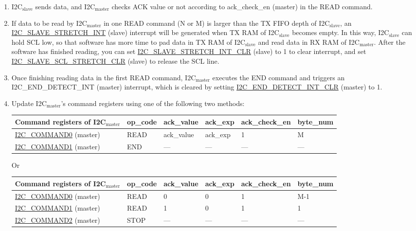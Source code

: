 \documentclass[main\_\_EN.tex]{subfiles}
\begin{document}
\begin{enumerate}
\item I2C$_\text{slave}$ sends data, and I2C$_\text{master}$ checks ACK value or not according to ack\_check\_en (master) in the READ command.
\item If data to be read by I2C$_\text{master}$ in one READ command (N or M) is larger than the TX FIFO depth of I2C$_\text{slave}$, an \hyperref[int:i2c-slave-stretch]{I2C\_SLAVE\_STRETCH\_INT} (slave) interrupt will be generated when TX RAM of I2C$_\text{slave}$ becomes empty. In this way, I2C$_\text{slave}$ can hold SCL low, so that software has more time to pad data in TX RAM of I2C$_\text{slave}$ and read data in RX RAM of I2C$_\text{master}$. After the software has finished reading, you can set \hyperref[fielddesc:I2CSLAVESTRETCHINTCLR]{I2C\_SLAVE\_STRETCH\_INT\_CLR} (slave) to 1 to clear interrupt, and set \hyperref[fielddesc:I2CSLAVESCLSTRETCHCLR]{I2C\_SLAVE\_SCL\_STRETCH\_CLR} (slave) to release the SCL line.
\item Once finishing reading data in the first READ command, I2C$_\text{master}$ executes the END command and triggers an I2C\_END\_DETECT\_INT (master) interrupt, which is cleared by setting \hyperref[fielddesc:I2CENDDETECTINTCLR]{I2C\_END\_DETECT\_INT\_CLR} (master) to 1.
\item Update I2C$_\text{master}$'s command registers using one of the following two methods:
\begin{longtable}{ | p{4cm} | p{2cm} | p{2cm} | p{2cm} |p{2cm} | p{2cm} |}
\hline\rowcolor{lightgray}
Command registers of I2C$_\text{master}$& op\_code & ack\_value&ack\_exp&ack\_check\_en&byte\_num  \\ \hline
\hyperref[fielddesc:I2CCOMMAND0]{I2C\_COMMAND0} (master)& READ& ack\_value&ack\_exp&1&M  \\ \hline
\hyperref[fielddesc:I2CCOMMAND1]{I2C\_COMMAND1} (master)& END& ---&---&---&---  \\ \hline
\end{longtable} 

Or

\begin{longtable}{ | p{4cm} | p{2cm} | p{2cm} | p{2cm} |p{2cm} | p{2cm} |}
\hline\rowcolor{lightgray}
Command registers of I2C$_\text{master}$& op\_code & ack\_value&ack\_exp&ack\_check\_en&byte\_num  \\ \hline
\hyperref[fielddesc:I2CCOMMAND0]{I2C\_COMMAND0} (master)& READ& 0&0&1&M-1  \\ \hline
\hyperref[fielddesc:I2CCOMMAND1]{I2C\_COMMAND1} (master)& READ& 1&0&1&1  \\ \hline
\hyperref[fielddesc:I2CCOMMAND2]{I2C\_COMMAND2} (master)& STOP& ---&---&---&---  \\ \hline
\end{longtable} 





\end{enumerate}
\end{document}
